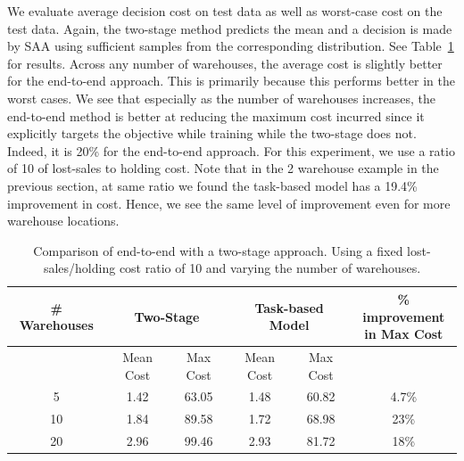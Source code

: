 \documentclass[poms,final,blindrev]{poms1_V1} %
\begin{document}
We evaluate average decision cost on test data as well as worst-case cost on the test data. Again, the two-stage method predicts the mean and a decision is made by SAA using sufficient samples from the corresponding distribution.  See Table~\ref{tab:e2e-multiple} for results.
Across any number of warehouses, the average cost is slightly better for the end-to-end approach. This is primarily because this performs better in the worst cases. We see that especially as the number of warehouses increases, the end-to-end method is better at reducing the maximum cost incurred since it explicitly targets the objective while training while the two-stage does not. Indeed, it is 20\% for the end-to-end approach. For this experiment, we use a ratio of 10 of lost-sales to holding cost. Note that in the 2 warehouse example in the previous section, at same ratio we found the task-based model has a 19.4\% improvement in cost. Hence, we see the same level of improvement even for more warehouse locations.




\begin{table}
    \centering
    \begin{tabular}{c c c c c c}
\# Warehouses & \multicolumn{2}{c}{Two-Stage} & \multicolumn{2}{c}{Task-based Model} & \makecell{\% improvement \\ in Max Cost} \\ \toprule
& Mean Cost & Max Cost & Mean Cost & Max Cost & \\ \midrule
5 & 1.42 & 63.05 & 1.48 & 60.82 & 4.7\% \\
10 & 1.84 & 89.58 & 1.72 & 68.98 & 23\%\\
20 & 2.96 & 99.46 & 2.93 & 81.72 & 18\% \\
        \bottomrule
    \end{tabular}
    \caption{Comparison of end-to-end with a two-stage approach. Using a fixed lost-sales/holding cost ratio of 10 and varying the number of warehouses.}
    \label{tab:e2e-multiple}
\end{table}
\end{document}
